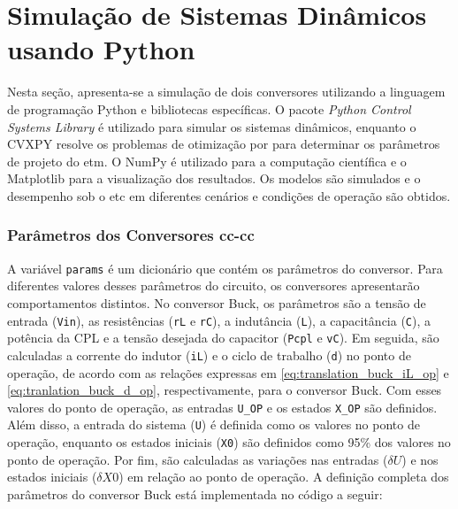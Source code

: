 \chapter{Simulação de Sistemas Dinâmicos usando Python} 


Nesta seção, apresenta-se a simulação de dois conversores utilizando a linguagem de programação Python e bibliotecas específicas. O pacote \textit{Python Control Systems Library} é utilizado para simular os sistemas dinâmicos, enquanto o CVXPY resolve os problemas de otimização por  para determinar os parâmetros de projeto do \acrshort{etm}. O NumPy é utilizado para a computação científica e o Matplotlib para a visualização dos resultados. Os modelos são simulados e o desempenho sob o \acrshort{etc} em diferentes cenários e condições de operação são obtidos.

\subsection{Parâmetros dos Conversores \acrshort{cc}-\acrshort{cc}}

A variável \texttt{params} é um dicionário que contém os parâmetros do conversor. Para diferentes valores desses parâmetros do circuito, os conversores apresentarão comportamentos distintos. No conversor Buck, os parâmetros são a tensão de entrada (\texttt{Vin}), as resistências (\texttt{rL} e \texttt{rC}), a indutância (\texttt{L}), a capacitância (\texttt{C}), a potência da CPL e a tensão desejada do capacitor (\texttt{Pcpl} e \texttt{vC}). Em seguida, são calculadas a corrente do indutor (\texttt{iL}) e o ciclo de trabalho (\texttt{d}) no ponto de operação, de acordo com as relações expressas em \eqref{eq:translation_buck_iL_op} e \eqref{eq:tranlation_buck_d_op}, respectivamente, para o conversor Buck. Com esses valores do ponto de operação, as entradas \texttt{U\_OP} e os estados \texttt{X\_OP} são definidos. Além disso, a entrada do sistema (\texttt{U}) é definida como os valores no ponto de operação, enquanto os estados iniciais (\texttt{X0}) são definidos como 95\% dos valores no ponto de operação. Por fim, são calculadas as variações nas entradas (\(\delta U\)) e nos estados iniciais ($\delta X0$) em relação ao ponto de operação. A definição completa dos parâmetros do conversor Buck está implementada no código a seguir: 

